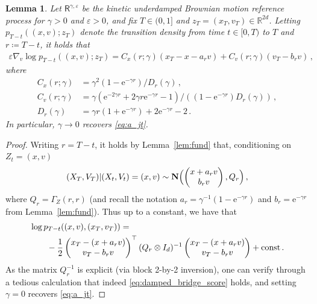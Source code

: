 \documentclass[12pt]{article}
\theoremstyle{plain}
\theoremstyle{plain}
\theoremstyle{remark}
\newcommand{\R}{\mathbb{R}}
\newcommand{\rme}{\mathrm{e}}
\newcommand*{\defeq}{\coloneqq}
\newcommand{\eps}{\varepsilon}
\newcommand{\gauss}{\mathbf{N}}
\newcommand{\1}{\bm{1}}
\theoremstyle{plain}
\newtheorem{lemma}[theorem]{Lemma}
\theoremstyle{definition}
\theoremstyle{remark}
\begin{document}
\begin{lemma}
Let $\mathsf R^{\gamma,\eps}$ be the kinetic underdamped Brownian motion reference process for $\gamma > 0$ and $\eps > 0$, and fix $T \in (0,1]$ and $z_T = (x_T,v_T) \in \R^{2d}$. Letting  $p_{T-t}((x,v);z_T)$ denote the transition density from time $t \in [0,T)$ to $T$ and $r \defeq T - t$, it holds that
\begin{align}\label{eq:damped_bridge_score}
    \eps \nabla_v \log p_{T-t}((x,v); z_T) =
    C_x(r;\gamma)(x_T - x - a_r v) + C_v(r;\gamma)(v_{T}- b_r v)\,,
\end{align}
where
\begin{align*}
    C_x(r;\gamma) &= \gamma^2(1-\rme^{-\gamma r})/D_r(\gamma)\,, \\
    C_v(r;\gamma) &= \gamma(\rme^{-2\gamma r} + 2 \gamma r \rme^{-\gamma r} - 1)/((1-\rme^{-\gamma r})D_r(\gamma))\,, \\
    D_r(\gamma) &= \gamma r(1 + \rme^{-\gamma r}) + 2\rme^{-\gamma r} - 2\,.
\end{align*}
In particular, $\gamma \to 0$ recovers \eqref{eq:a_jt}.
\end{lemma}
\begin{proof}
Writing $r = T-t$, it holds by Lemma~\ref{lem:fund} that, conditioning on $Z_t = (x,v)$
\begin{align*}
    (X_T,V_T) | (X_t,V_t) = (x,v) \sim {\gauss}\Bigl(\begin{pmatrix}
        x + a_rv \\
        b_r v
    \end{pmatrix},  Q_r\Bigr)\,,
\end{align*}
where $Q_r = \Gamma_Z(r,r)$ (and recall the notation $a_r = \gamma^{-1}(1-\rme^{-\gamma r})$ and $b_r = \rme^{-\gamma r}$ from Lemma~\ref{lem:fund}).
Thus up to a constant, we have that
\begin{align*}
&\log p_{T-t}((x,v),(x_T,v_T)) =\\
&\qquad -\frac{1}{2} \begin{pmatrix}
    x_T -
    (x + a_r v)\\
    v_T - b_r v
\end{pmatrix}^\top (Q_r \otimes I_d)^{-1}\begin{pmatrix}
    x_T -
    (x + a_r v)\\
    v_T - b_r v
\end{pmatrix}  + {\rm const}\,.
\end{align*}
As the matrix $Q_r^{-1}$ is explicit (via block 2-by-2 inversion), one can verify through a tedious calculation that indeed \eqref{eq:damped_bridge_score} holds, and setting $\gamma = 0$ recovers \eqref{eq:a_jt}.
\end{proof}
\end{document}
